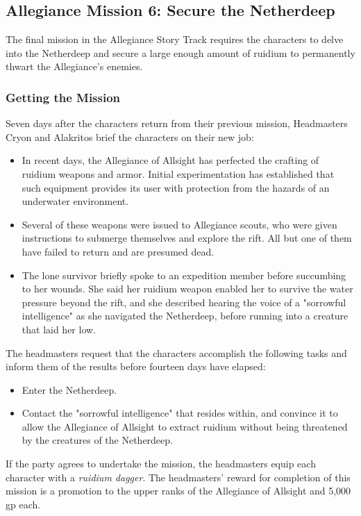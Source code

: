 \documentclass[10pt,a4paper,twoside,fancy,bg=print,twocolumn,openany,nodeprecatedcode]{dndbook}
\begin{document}
\subsection{Allegiance Mission 6: Secure the Netherdeep}
The final mission in the Allegiance Story Track requires the characters to delve into the Netherdeep and secure a large enough amount of ruidium to permanently thwart the Allegiance's enemies.

\subsubsection{Getting the Mission}
Seven days after the characters return from their previous mission, Headmasters Cryon and Alakritos brief the characters on their new job:


\begin{itemize}
\item In recent days, the Allegiance of Allsight has perfected the crafting of ruidium weapons and armor. Initial experimentation has established that such equipment provides its user with protection from the hazards of an underwater environment.
\item Several of these weapons were issued to Allegiance scouts, who were given instructions to submerge themselves and explore the rift. All but one of them have failed to return and are presumed dead.
\item The lone survivor briefly spoke to an expedition member before succumbing to her wounds. She said her ruidium weapon enabled her to survive the water pressure beyond the rift, and she described hearing the voice of a "sorrowful intelligence" as she navigated the Netherdeep, before running into a creature that laid her low.
\end{itemize}

The headmasters request that the characters accomplish the following tasks and inform them of the results before fourteen days have elapsed:


\begin{itemize}
\item Enter the Netherdeep.
\item Contact the "sorrowful intelligence" that resides within, and convince it to allow the Allegiance of Allsight to extract ruidium without being threatened by the creatures of the Netherdeep.
\end{itemize}

If the party agrees to undertake the mission, the headmasters equip each character with a \textit{ruidium dagger}. The headmasters' reward for completion of this mission is a promotion to the upper ranks of the Allegiance of Allsight and 5,000 gp each.
\end{document}
